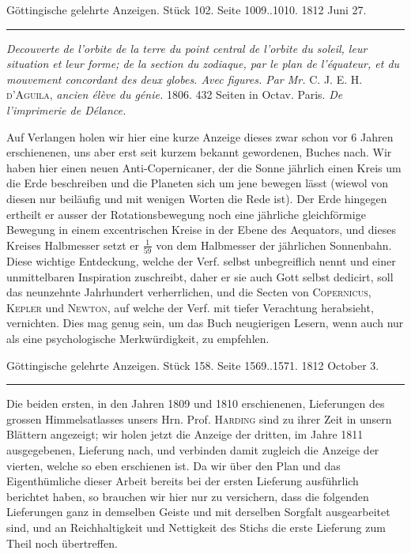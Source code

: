 \clearpage
{}
\hypertarget{native-546-middle}{}\label{native-546-middle}
\begin{center}\small Göttingische gelehrte Anzeigen. Stück 102. Seite 1009..1010. 1812 Juni 27.\\[3pt]\rule{.72\linewidth}{.3pt}\end{center}

\emph{Decouverte de l'orbite de la terre du point central de l'orbite du soleil, leur situation et leur forme; de la section du zodiaque, par le plan de l'équateur, et du mouvement concordant des deux globes. Avec figures. Par Mr.} \textsc{C. J. E. H. d'Aguila}, \emph{ancien élève du génie.} 1806. 432 Seiten in Octav. Paris. \emph{De l'imprimerie de Délance.}

Auf Verlangen holen wir hier eine kurze Anzeige dieses zwar schon vor 6 Jahren erschienenen, uns aber erst seit kurzem bekannt gewordenen, Buches nach. Wir haben hier einen neuen Anti-Copernicaner, der die Sonne jährlich einen Kreis um die Erde beschreiben und die Planeten sich um jene bewegen lässt (wiewol von diesen nur beiläufig und mit wenigen Worten die Rede ist). Der Erde hingegen ertheilt er ausser der Rotationsbewegung noch eine jährliche gleichförmige Bewegung in einem excentrischen Kreise in der Ebene des Aequators, und dieses Kreises Halbmesser setzt er $\frac{1}{59}$ von dem Halbmesser der jährlichen Sonnenbahn. Diese wichtige Entdeckung, welche der Verf. selbst unbegreiflich nennt und einer unmittelbaren Inspiration zuschreibt, daher er sie auch Gott selbst dedicirt, soll das neunzehnte Jahrhundert verherrlichen, und die Secten von \textsc{Copernicus}, \textsc{Kepler} und \textsc{Newton}, auf welche der Verf. mit tiefer Verachtung herabsieht, vernichten. Dies mag genug sein, um das Buch neugierigen Lesern, wenn auch nur als eine psychologische Merkwürdigkeit, zu empfehlen.

\clearpage
{}
\hypertarget{native-546-lower}{}\label{native-546-lower}
\begin{center}\small Göttingische gelehrte Anzeigen. Stück 158. Seite 1569..1571. 1812 October 3.\\[3pt]\rule{.72\linewidth}{.3pt}\end{center}

Die beiden ersten, in den Jahren 1809 und 1810 erschienenen, Lieferungen des grossen Himmelsatlasses unsers Hrn. Prof. \textsc{Harding} sind zu ihrer Zeit in unsern Blättern angezeigt; wir holen jetzt die Anzeige der dritten, im Jahre 1811 ausgegebenen, Lieferung nach, und verbinden damit zugleich die Anzeige der vierten, welche so eben erschienen ist. Da wir über den Plan und das Eigenthümliche dieser Arbeit bereits bei der ersten Lieferung ausführlich berichtet haben, so brauchen wir hier nur zu versichern, dass die folgenden Lieferungen ganz in demselben Geiste und mit derselben Sorgfalt ausgearbeitet sind, und an Reichhaltigkeit und Nettigkeit des Stichs die erste Lieferung zum Theil noch übertreffen.

